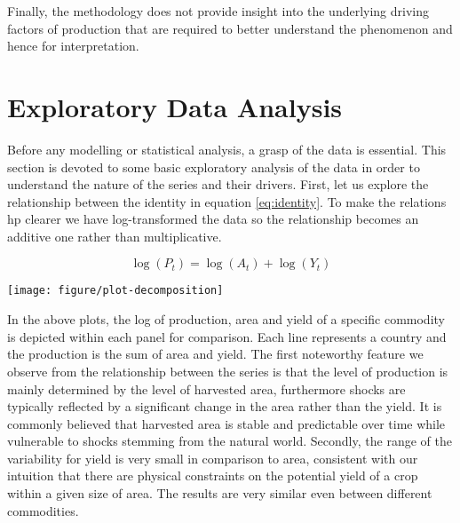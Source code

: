 \documentclass[nojss]{jss}\usepackage{graphicx, color}
\newenvironment{knitrout}{}{} %
\begin{document}
Finally, the methodology does not provide insight into the
underlying driving factors of production that are required to better understand the phenomenon and hence for
interpretation.



\section{Exploratory Data Analysis}




Before any modelling or statistical analysis, a grasp of the data is
essential. This section is devoted to some basic exploratory analysis
of the data in order to understand the nature of the series and their
drivers. First, let us explore the relationship between the identity
in equation \ref{eq:identity}. To make the relations hp clearer we have
log-transformed the data so the relationship becomes an additive one
rather than multiplicative.

\begin{equation}
  \label{eq:logIdentity}
  \log(P_t) = \log(A_t) + \log(Y_t)
\end{equation}



















\begin{knitrout}
\color{fgcolor}

{\centering \texttt{[image: figure/plot-decomposition]} 

}



\end{knitrout}


In the above plots, the log of production, area and yield of a
specific commodity is depicted within each panel for comparison. Each
line represents a country and the production is the sum of area and
yield. The first noteworthy feature we observe from the relationship
between the series is that the level of production is mainly
determined by the level of harvested area, furthermore shocks are
typically reflected by a significant change in the area rather than
the yield. It is commonly believed that harvested area is stable and
predictable over time while vulnerable to shocks stemming from the
natural world.  Secondly, the range of the variability for yield is
very small in comparison to area, consistent with our intuition that
there are physical constraints on the potential yield of a crop within
a given size of area. The results are very similar even between
different commodities.
\end{document}
